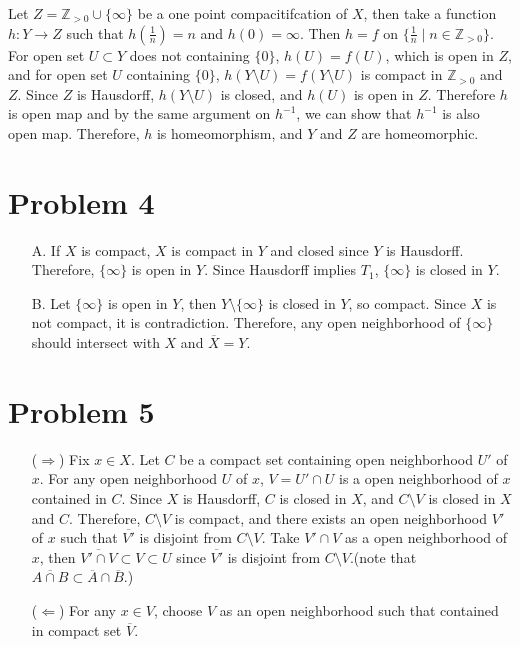 \documentclass{article}
\begin{document}
Let $Z=\mathbb{Z}_{>0}\cup \{\infty\}$ be a one point compacitifcation of $X$, then take a function $h:Y\rightarrow Z$ such that $h(\frac{1}{n})=n$ and $h(0)=\infty$. Then $h=f$ on $\{\frac{1}{n} \mid n\in \mathbb{Z}_{>0}\}$. For open set $U\subset Y$ does not containing $\{0\}$, $h(U)=f(U)$, which is open in $Z$, and for open set $U$ containing $\{0\}$, $h(Y\setminus U)=f(Y\setminus U)$ is compact in $\mathbb{Z}_{>0}$ and $Z$. Since $Z$ is Hausdorff, $h(Y\setminus U)$ is closed, and $h(U)$ is open in $Z$. Therefore $h$ is open map and by the same argument on $h^{-1}$, we can show that $h^{-1}$ is also open map. Therefore, $h$ is homeomorphism, and $Y$ and $Z$ are homeomorphic.

\section*{Problem 4}
\begin{enumerate}
\item[A.] If $X$ is compact, $X$ is compact in $Y$ and closed since $Y$ is Hausdorff. Therefore, $\{\infty\}$ is open in $Y$. Since Hausdorff implies $T_1$, $\{\infty\}$ is closed in $Y$.
\item[B.] Let $\{\infty\}$ is open in $Y$, then $Y\setminus\{\infty\}$ is closed in $Y$, so compact. Since $X$ is not compact, it is contradiction. Therefore, any open neighborhood of $\{\infty\}$ should intersect with $X$ and $\overline{X}=Y$.
\end{enumerate}
\section*{Problem 5}
\begin{enumerate}
\item[($\Rightarrow$)] Fix $x\in X$. Let $C$ be a compact set containing open neighborhood $U'$ of $x$. For any open neighborhood $U$ of $x$, $V=U'\cap U$ is a open neighborhood of $x$ contained in $C$. Since $X$ is Hausdorff, $C$ is closed in $X$, and $C\setminus V$ is closed in $X$ and $C$. Therefore, $C\setminus V$ is compact, and there exists an open neighborhood $V'$ of $x$ such that $\overline{V'}$ is disjoint from $C\setminus V$. Take $V'\cap V$ as a open neighborhood of $x$, then $\overline{V'\cap V} \subset V\subset U$ since $\overline{V'}$ is disjoint from $C\setminus V$.(note that $\overline{A\cap B}\subset \overline{A}\cap \overline{B}$.)
\item[($\Leftarrow$)] For any $x\in V$, choose $V$ as an open neighborhood such that contained in compact set $\overline{V}$.
\end{enumerate}
\end{document}
